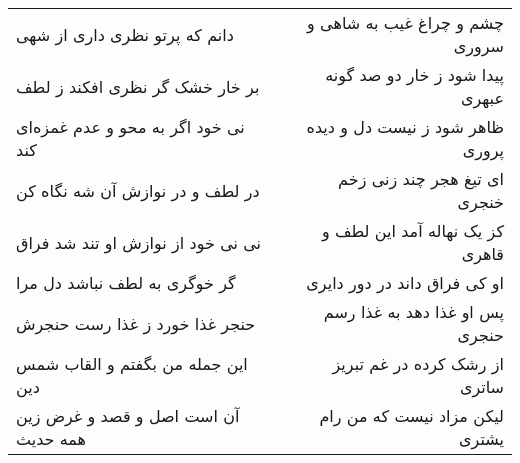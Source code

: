 \begin{center}
\begin{longtable}{l p{0.5cm} r}
دانم که پرتو نظری داری از شهی
&&
چشم و چراغ غیب به شاهی و سروری
\\
بر خار خشک گر نظری افکند ز لطف
&&
پیدا شود ز خار دو صد گونه عبهری
\\
نی خود اگر به محو و عدم غمزه‌ای کند
&&
ظاهر شود ز نیست دل و دیده پروری
\\
در لطف و در نوازش آن شه نگاه کن
&&
ای تیغ هجر چند زنی زخم خنجری
\\
نی نی خود از نوازش او تند شد فراق
&&
کز یک نهاله آمد این لطف و قاهری
\\
گر خوگری به لطف نباشد دل مرا
&&
او کی فراق داند در دور دایری
\\
حنجر غذا خورد ز غذا رست حنجرش
&&
پس او غذا دهد به غذا رسم حنجری
\\
این جمله من بگفتم و القاب شمس دین
&&
از رشک کرده در غم تبریز ساتری
\\
آن است اصل و قصد و غرض زین همه حدیث
&&
لیکن مزاد نیست که من رام یشتری
\\
\end{longtable}
\end{center}
